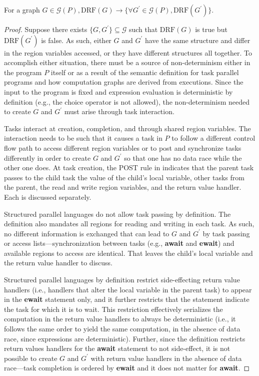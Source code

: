 \begin{lemma} 
\label{lem:drf}
For a graph $G \in \mathcal{G}( P ), \mathrm{DRF}( G ) \rightarrow \{\forall G^\prime \in \mathcal{G}( P ), \mathrm{DRF}( G^\prime ) \}$.
\end{lemma}
\begin{proof}
  Suppose there exists $\{G,G^\prime\} \subseteq \mathcal{G}$ such that $\mathrm{DRF}( G )$ is true but $\mathrm{DRF}( G^\prime )$ is false. As such, either $G$ and $G^\prime$ have the same structure and differ in the region variables accessed, or they have different structures all together. To accomplish either situation, there must be a source of non-determinism either in the program $P$ itself or as a result of the semantic definition for task parallel programs and how computation graphs are derived from executions. Since the input to the program is fixed and expression evaluation is deterministic by definition (e.g., the choice operator is not allowed), the non-determinism needed to create $G$ and $G^\prime$ must arise through task interaction. 

  Tasks interact at creation, completion, and through shared region variables. The interaction needs to be such that it causes a task in $P$ to follow a different control flow path to access different region variables or to post and synchronize tasks differently in order to create $G$ and $G^\prime$ so that one has no data race while the other one does. At task creation, the POST rule in  indicates that the parent task passes to the child task the value of the child's local variable, other tasks from the parent, the read and write region variables, and the return value handler. Each is discussed separately.

  Structured parallel languages do not allow task passing by definition. The definition also mandates all regions for reading and writing in each task. As such, no different information is exchanged that can lead to $G$ and $G^\prime$ by task passing or access lists---synchronization between tasks (e.g., \textbf{await} and \textbf{ewait}) and available regions to access are identical. That leaves the child's local variable and the return value handler to discuss.

  Structured parallel languages by definition restrict side-effecting return value handlers (i.e., handlers that alter the local variable in the parent task) to appear in the \textbf{ewait} statement only, and it further restricts that the statement indicate the task for which it is to wait. This restriction effectively serializes the computation in the return value handlers to always be deterministic (i.e., it follows the same order to yield the same computation, in the absence of data race, since expressions are deterministic). Further, since the definition restricts return values handlers for the \textbf{await} statement to not side-effect, it is not possible to create $G$ and $G^\prime$ with return value handlers in the absence of data race---task completion is ordered by \textbf{ewait} and it does not matter for \textbf{await}. 


\end{proof}
